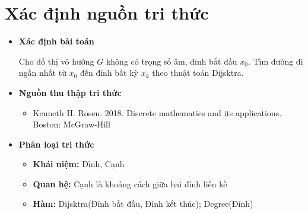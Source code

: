 \section{Xác định nguồn tri thức} 

\begin{itemize}
	\item \textbf{Xác định bài toán}
	
	Cho đồ thị vô hướng $G$ không có trọng số âm, đỉnh bắt đầu $x_0$. Tìm đường đi ngắn nhất từ $x_0$ đến đỉnh bất kỳ $x_k$ theo thuật toán Dijsktra.
	
	\item \textbf{Nguồn thu thập tri thức}
	\begin{itemize}
		\item Kenneth H. Rosen. 2018. Discrete mathematics and its applications. Boston: McGraw-Hill
	\end{itemize}
	
	\item \textbf{Phân loại tri thức}
	\begin{itemize}
		\item \textbf{Khái niệm: } Đỉnh, Cạnh
		\item \textbf{Quan hệ: } Cạnh là khoảng cách giữa hai đỉnh liền kề
		\item \textbf{Hàm: } Dijsktra(Đỉnh bắt đầu, Đỉnh kết thúc); Degree(Đỉnh)
	\end{itemize}
\end{itemize}





